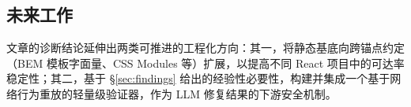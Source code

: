 \begin{table}[t]
\centering
\caption{解析器 strict/permissive 敏感性（koenig，$n=93$）。permissive 为本文所采用的假设；strict 关闭“动态属性值视为可能匹配”与“同文件祖先近似”两处过近似。}
\label{tab:resolver-sens}
\small
{}
\end{table}

\subsection{未来工作}
文章的诊断结论延伸出两类可推进的工程化方向：其一，将静态基底向跨锚点约定（BEM 模板字面量、CSS Modules 等）扩展，以提高不同 React 项目中的可达率稳定性；其二，基于 \S\ref{sec:findings} 给出的经验性必要性，构建并集成一个基于网络行为重放的轻量级验证器，作为 LLM 修复结果的下游安全机制。
